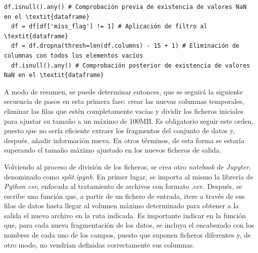 \vspace{3mm}

\begin{lstlisting}[style=Python, caption={Eliminación de valores NaN}]
  df.isnull().any() # Comprobación previa de existencia de valores NaN en el \textit{dataframe}
  df = df[df['miss_flag'] != 1] # Aplicación de filtro al \textit{dataframe}
  df = df.dropna(thresh=len(df.columns) - 15 + 1) # Eliminación de columnas con todos los elementos vacíos
  df.isnull().any() # Comprobación posterior de existencia de valores NaN en el \textit{dataframe}
\end{lstlisting}

\vspace{3mm}

\pagebreak

A modo de resumen, se puede determinar entonces, que se seguirá la siguiente secuencia de pasos en esta primera fase: crear las nuevas columnas temporales, eliminar las filas que estén completamente vacías y dividir los ficheros iniciales para ajustar su tamaño a un máximo de 100MB. Es obligatorio seguir este orden, puesto que no sería eficiente extraer los fragmentos del conjunto de datos y, después, añadir información nueva. En otros términos, de esta forma se estaría superando el tamaño máximo ajustado en los nuevos ficheros de salida.

\vspace{3mm}

Volviendo al proceso de división de los ficheros, se crea otro \textit{notebook} de \textit{Jupyter}, denominado como \textit{split.ipynb}. En primer lugar, se importa al mismo la librería de \textit{Python} \textit{csv}, enfocada al tratamiento de archivos con formato .csv. Después, se escribe una función que, a partir de un fichero de entrada, itere a través de sus filas de datos hasta llegar al volumen máximo determinado para obtener a la salida el nuevo archivo en la ruta indicada. Es importante indicar en la función que, para cada nueva fragmentación de los datos, se incluya el encabezado con los nombres de cada uno de los campos, puesto que suponen ficheros diferentes y, de otro modo, no vendrían definidas correctamente sus columnas.

\vspace{3mm}

